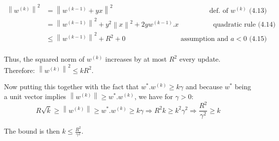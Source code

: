 \documentclass[11pt]{article}
\begin{document}
\begin{align*}
\left \| w^{(k)} \right \|^2 &= \left \| w^{(k-1)} + yx\right \|^2 \qquad \qquad \qquad \qquad \qquad \qquad \qquad \textrm{def. of $w^{(k)}$ (4.13)}  \\ 
 &= \left \| w^{(k-1)} \right \|^2 + y^2\left \| x\right \|^2 + 2yw^{(k-1)}.x  \qquad \qquad \quad \textrm{quadratic rule (4.14)}\\ 
 &\leq \left \| w^{(k-1)} \right \|^2 + R^2 + 0 \qquad \qquad \qquad \qquad \textrm{assumption and $a < 0$  (4.15)} \\
\end{align*}

Thus, the squared norm of \(w^{(k)}\) increases by at most \(R^2\) every
update. Therefore: \(\left \| w^{(k)} \right \|^2 \le k R^2\).

Now putting this together with the fact that
\(w^* . w^{(k)} \ge k \gamma\) and because \(w^*\) being a unit vector
implies \(\left \| w^{(k)} \right \| \ge w^* . w^{(k)}\), we have for
\(\gamma > 0\):
\[ R \sqrt k \ge \left \| w^{(k)} \right \| \ge w^* . w^{(k)} \ge k \gamma \Rightarrow R^2 k \ge k^2 \gamma ^2 \Rightarrow \frac{R^2}{\gamma ^2} \ge k  \]

The bound is then \(k \le \frac{R^2}{\gamma ^2}.\)


    
    
    
    
\end{document}

